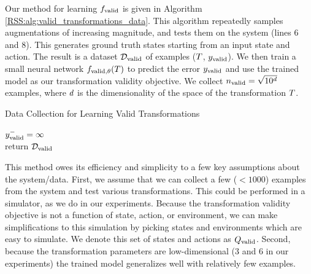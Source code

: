 Our method for learning $f_\text{valid}$ is given in Algorithm \ref{RSS:alg:valid_transformations_data}. This algorithm repeatedly samples augmentations of increasing magnitude, and tests them on the system (lines 6 and 8). This generates ground truth states starting from an input state and action. The result is a dataset $\learnValidDataset$ of examples ($T$, $y_\text{valid}$). We then train a small neural network $f_{\text{valid},\theta}(T)$ to predict the error $y_\text{valid}$ and use the trained model as our transformation validity objective. We collect $n_\text{valid} = \sqrt{10^d}$ examples, where $d$ is the dimensionality of the space of the transformation $T$.

\begin{algorithm}[t]
\caption{Data Collection for Learning Valid Transformations}\label{RSS:alg:valid_transformations_data}
\KwIn{$\learnValidStateActionSet,\nLearnValid$}
\KwOut{$\learnValidDataset$}
$y_\text{valid}^- = \infty$ \\
return $\learnValidDataset$
\end{algorithm}

This method owes its efficiency and simplicity to a few key assumptions about the system/data. First, we assume that we can collect a few ($<1000$) examples from the system and test various transformations. This could be performed in a simulator, as we do in our experiments. Because the transformation validity objective is not a function of state, action, or environment, we can make simplifications to this simulation by picking states and environments which are easy to simulate. We denote this set of states and actions as $Q_\text{valid}$. Second, because the transformation parameters are low-dimensional (3 and 6 in our experiments) the trained model generalizes well with relatively few examples.

